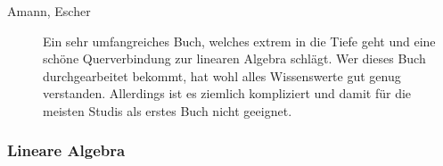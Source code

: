 \begin{description}
\item[Amann, Escher]{
Ein sehr umfangreiches Buch, welches extrem in die Tiefe geht und eine
schöne Querverbindung zur linearen Algebra schlägt. Wer dieses Buch
durchgearbeitet bekommt, hat wohl alles Wissenswerte gut genug verstanden.
Allerdings ist es ziemlich kompliziert und damit für die meisten Studis 
als erstes Buch nicht geeignet.}

\end{description}


\subsubsection*{Lineare Algebra}
